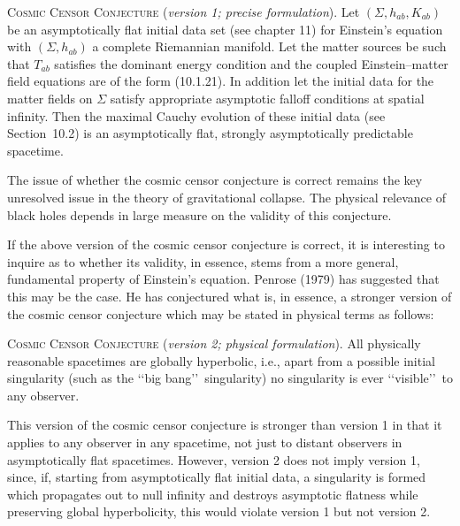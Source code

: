 \medskip
\noindent\textsc{Cosmic Censor Conjecture} (\emph{version 1; precise formulation}).
Let \((\Sigma,h_{ab},K_{ab})\) be an asymptotically flat initial data set (see
chapter 11) for Einstein's equation with \((\Sigma,h_{ab})\) a complete Riemannian
manifold. Let the matter sources be such that \(T_{ab}\) satisfies the dominant
energy condition and the coupled Einstein--matter field equations are of the form
(10.1.21). In addition let the initial data for the matter fields on \(\Sigma\) satisfy
appropriate asymptotic falloff conditions at spatial infinity. Then the maximal
Cauchy evolution of these initial data (see Section~10.2) is an asymptotically flat,
strongly asymptotically predictable spacetime.
\medskip

The issue of whether the cosmic censor conjecture is correct remains the key
unresolved issue in the theory of gravitational collapse. The physical relevance of
black holes depends in large measure on the validity of this conjecture.

If the above version of the cosmic censor conjecture is correct, it is interesting to
inquire as to whether its validity, in essence, stems from a more general,
fundamental property of Einstein's equation. Penrose (1979) has suggested that this
may be the case. He has conjectured what is, in essence, a stronger version of the
cosmic censor conjecture which may be stated in physical terms as follows:

\medskip
\noindent\textsc{Cosmic Censor Conjecture} (\emph{version 2; physical formulation}).
All physically reasonable spacetimes are globally hyperbolic, i.e., apart from a
possible initial singularity (such as the \lq\lq big bang\rq\rq\ singularity) no
singularity is ever \lq\lq visible\rq\rq\ to any observer.
\medskip

This version of the cosmic censor conjecture is stronger than version 1 in that it
applies to any observer in any spacetime, not just to distant observers in
asymptotically flat spacetimes. However, version 2 does not imply version 1, since,
if, starting from asymptotically flat initial data, a singularity is formed which
propagates out to null infinity and destroys asymptotic flatness while preserving
global hyperbolicity, this would violate version 1 but not version 2.

